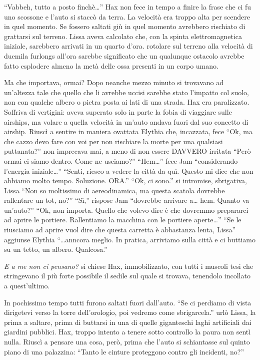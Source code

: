     ``Vabbeh, tutto a posto finchè\dots{}'' Hax non fece in tempo a finire
    la frase che ci fu uno scossone e l'auto si staccò da terra. La
    velocità era troppo alta per scendere in quel momento. Se fossero
    saltati giù in quel momento avrebbero rischiato di grattarsi sul
    terreno. Lissa aveva calcolato che, con la spinta elettromagnetica
    iniziale, sarebbero arrivati in un quarto d'ora. rotolare sul terreno
    alla velocità di duemila furlongs all'ora sarebbe significato che un
    qualunque ostacolo avrebbe fatto esplodere almeno la metà delle ossa
    presenti in un corpo umano.

    Ma che importava, ormai? Dopo neanche mezzo minuto si trovavano ad
    un'altezza tale che quello che li avrebbe uccisi sarebbe stato
    l'impatto col suolo, non con qualche albero o pietra posta ai lati di
    una strada. Hax era paralizzato. Soffriva di vertigini: aveva superato
    solo in parte la fobia di viaggiare sulle airships, ma volare a quella
    velocità in un'auto andava fuori dal suo concetto di airship. Riuscì
    a sentire in maniera ovattata Elythia che, incazzata, fece ``Ok, ma che
    cazzo devo fare con voi per non rischiare la morte per una qualsiasi
    puttanata?'' non imprecava mai, a meno di non essere DAVVERO irritata
    ``Però ormai ci siamo dentro. Come ne usciamo?'' ``Hem\dots{}'' fece
    Jam ``considerando l'energia iniziale\dots{}'' ``Senti, riesco a vedere
    la città da quì. Questo mi dice che non abbiamo molto tempo. Soluzione.
    ORA.'' ``Ok, ci sono.'' si intromise, sbrigativa, Lissa ``Non so
    moltissimo di aereodinamica, ma questa scatola dovrebbe rallentare un
    tot, no?'' ``Sì,'' rispose Jam ``dovrebbe arrivare a\dots{} hem. Quanto
    va un'auto?'' ``Ok, non importa. Quello che volevo dire è che dovremmo
    prepararci ad aprire le portiere. Rallentiamo la macchina con le
    portiere aperte\dots{}'' ``Se le riusciamo ad aprire vuol dire che
    questa carretta è abbastanza lenta, Lissa'' aggiunse Elythia
    ``\dots{}anncora meglio. In pratica, arriviamo sulla città e ci
    buttiamo su un tetto, un albero. Qualcosa.''

    \emph{E a me non ci pensano?} si chiese Hax, immobilizzato, con tutti i
    muscoli tesi che stringevano il più forte possibile il sedile sul quale
    si trovava, tenendolo incollato a quest'ultimo.

    In pochissimo tempo tutti furono saltati fuori dall'auto. ``Se ci
    perdiamo di vista dirigetevi verso la torre dell'orologio, poi vedremo
    come sbrigarcela.'' urlò Lissa, la prima a saltare, prima di buttarsi
    in una di quelle giganteschi laghi artificiali dai giardini pubblici.
    Hax, troppo intento a tenere sotto controllo la paura non sentì nulla.
    Riuscì a pensare una cosa, però, prima che l'auto si schiantasse
    sul quinto piano di una palazzina: ``Tanto le cinture proteggono contro
    gli incidenti, no?''

